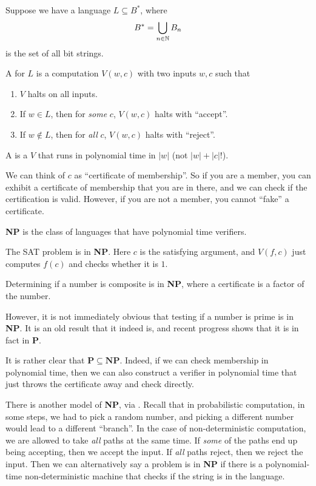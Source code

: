 \begin{defi}[Verifier]
  Suppose we have a language $L \subseteq B^*$, where
  \[
    B^* = \bigcup_{n \in \mathbb{N}} B_n
  \]
  is the set of all bit strings.

  A  for $L$ is a computation $V(w, c)$ with two inputs $w, c$ such that
  \begin{enumerate}
    \item $V$ halts on all inputs.
    \item If $w \in L$, then for \emph{some} $c$, $V(w, c)$ halts with ``accept''.
    \item If $w \not\in L$, then for \emph{all} $c$, $V(w, c)$ halts with ``reject''.
  \end{enumerate}
  A  is a $V$ that runs in polynomial time in $|w|$ (not $|w| + |c|!$).
\end{defi}
We can think of $c$ as ``certificate of membership''. So if you are a member, you can exhibit a certificate of membership that you are in there, and we can check if the certification is valid. However, if you are not a member, you cannot ``fake'' a certificate.

\begin{defi}
  \textbf{NP} is the class of languages that have polynomial time verifiers.
\end{defi}

\begin{eg}
  The SAT problem is in \textbf{NP}. Here $c$ is the satisfying argument, and $V(f, c)$ just computes $f(c)$ and checks whether it is $1$.
\end{eg}

\begin{eg}
  Determining if a number is composite is in \textbf{NP}, where a certificate is a factor of the number.
\end{eg}
However, it is not immediately obvious that testing if a number is prime is in \textbf{NP}. It is an old result that it indeed is, and recent progress shows that it is in fact in \textbf{P}.

It is rather clear that $\mathbf{P} \subseteq \mathbf{NP}$. Indeed, if we can check membership in polynomial time, then we can also construct a verifier in polynomial time that just throws the certificate away and check directly.

There is another model of \textbf{NP}, via . Recall that in probabilistic computation, in some steps, we had to pick a random number, and picking a different number would lead to a different ``branch''. In the case of non-deterministic computation, we are allowed to take \emph{all} paths at the same time. If \emph{some} of the paths end up being accepting, then we accept the input. If \emph{all} paths reject, then we reject the input. Then we can alternatively say a problem is in \textbf{NP} if there is a polynomial-time non-deterministic machine that checks if the string is in the language.

